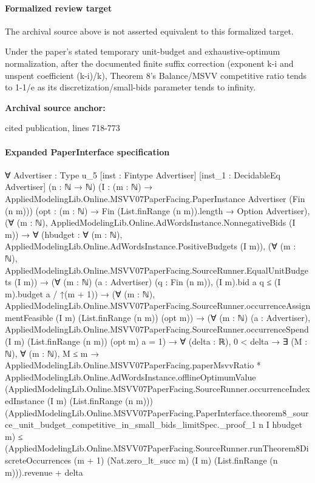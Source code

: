 \documentclass[10pt]{article}
\begin{document}
\paragraph{Formalized review target}
The archival source above is not asserted equivalent to this formalized target.
\begin{ReviewVerbatim}
Under the paper's stated temporary unit-budget and exhaustive-optimum normalization, after the documented finite suffix correction (exponent k-i and unspent coefficient (k-i)/k), Theorem 8's Balance/MSVV competitive ratio tends to 1-1/e as its discretization/small-bids parameter tends to infinity.
\end{ReviewVerbatim}

\textbf{Archival source anchor:} {\footnotesize\raggedright cited publication, lines 718-\allowbreak{}773\par}
\paragraph{Expanded PaperInterface specification}
\begin{ReviewVerbatim}
∀ {Advertiser : Type u_5} [inst : Fintype Advertiser] [inst_1 : DecidableEq Advertiser] (n : ℕ → ℕ)
  (I : (m : ℕ) → AppliedModelingLib.Online.MSVV07PaperFacing.PaperInstance Advertiser (Fin (n m)))
  (opt : (m : ℕ) → Fin (List.finRange (n m)).length → Option Advertiser),
  (∀ (m : ℕ), AppliedModelingLib.Online.AdWordsInstance.NonnegativeBids (I m)) →
    ∀ (hbudget : ∀ (m : ℕ), AppliedModelingLib.Online.AdWordsInstance.PositiveBudgets (I m)),
      (∀ (m : ℕ), AppliedModelingLib.Online.MSVV07PaperFacing.SourceRunner.EqualUnitBudgets (I m)) →
        (∀ (m : ℕ) (a : Advertiser) (q : Fin (n m)), (I m).bid a q ≤ (I m).budget a / ↑(m + 1)) →
          (∀ (m : ℕ),
              AppliedModelingLib.Online.MSVV07PaperFacing.SourceRunner.occurrenceAssignmentFeasible (I m)
                (List.finRange (n m)) (opt m)) →
            (∀ (m : ℕ) (a : Advertiser),
                AppliedModelingLib.Online.MSVV07PaperFacing.SourceRunner.occurrenceSpend (I m) (List.finRange (n m))
                    (opt m) a =
                  1) →
              ∀ (delta : ℝ),
                0 < delta →
                  ∃ (M : ℕ),
                    ∀ (m : ℕ),
                      M ≤ m →
                        AppliedModelingLib.Online.MSVV07PaperFacing.paperMsvvRatio *
                            AppliedModelingLib.Online.AdWordsInstance.offlineOptimumValue
                              (AppliedModelingLib.Online.MSVV07PaperFacing.SourceRunner.occurrenceIndexedInstance (I m)
                                (List.finRange (n m)))
                              (AppliedModelingLib.Online.MSVV07PaperFacing.PaperInterface.theorem8_source_unit_budget_competitive_in_small_bids_limitSpec._proof_1
                                n I hbudget m) ≤
                          (AppliedModelingLib.Online.MSVV07PaperFacing.SourceRunner.runTheorem8DiscreteOccurrences
                                (m + 1) (Nat.zero_lt_succ m) (I m) (List.finRange (n m))).revenue +
                            delta
\end{ReviewVerbatim}
\end{document}
